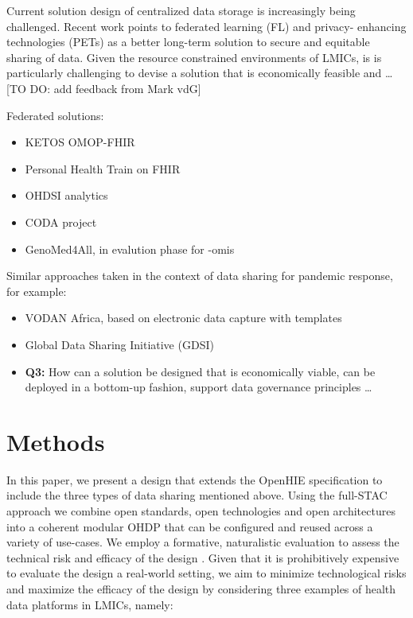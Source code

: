 \documentclass[
  authoryear]{elsarticle}
\providecommand{\tightlist}{%
  \setlength{\itemsep}{0pt}\setlength{\parskip}{0pt}}\usepackage{longtable,booktabs,array}
\begin{document}
Current solution design of centralized data storage is increasingly
being challenged. Recent work points to federated learning (FL)
\citep{rieke2020future} and privacy- enhancing technologies (PETs)
\citep{scheibner2021revolutionizing, jordan2022selecting} as a better
long-term solution to secure and equitable sharing of data. Given the
resource constrained environments of LMICs, is is particularly
challenging to devise a solution that is economically feasible and
\ldots{} {[}TO DO: add feedback from Mark vdG{]}

Federated solutions:

\begin{itemize}
\tightlist
\item
  KETOS OMOP-FHIR \citep{gruendner2019ketos}
\item
  Personal Health Train on FHIR \citep{choudhury2020personal}
\item
  OHDSI analytics \citep{khalid2021standardized}
\item
  CODA project \citep{mullie2023coda}
\item
  GenoMed4All, in evalution phase for -omis \citep{cremonesi2023need}
\end{itemize}

Similar approaches taken in the context of data sharing for pandemic
response, for example:

\begin{itemize}
\item
  VODAN Africa, based on electronic data capture with templates
  \citep{purnamajati2022data}
\item
  Global Data Sharing Initiative (GDSI) \citep{pirmani2023journey}
\item
  \textbf{Q3:} How can a solution be designed that is economically
  viable, can be deployed in a bottom-up fashion, support data
  governance principles \ldots{}
\end{itemize}

\section{Methods}\label{methods}

In this paper, we present a design that extends the OpenHIE
specification to include the three types of data sharing mentioned
above. Using the full-STAC approach \citep{mehl2023fullstac} we combine
open standards, open technologies and open architectures into a coherent
modular OHDP that can be configured and reused across a variety of
use-cases. We employ a formative, naturalistic evaluation to assess the
technical risk and efficacy of the design \citep{venable2016feds}. Given
that it is prohibitively expensive to evaluate the design a real-world
setting, we aim to minimize technological risks and maximize the
efficacy of the design by considering three examples of health data
platforms in LMICs, namely:
\end{document}
